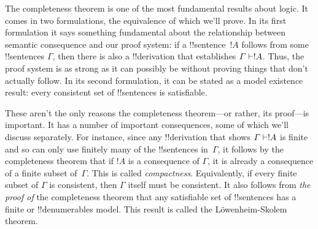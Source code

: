 \documentclass[../../include/open-logic-section]{subfiles}
\begin{document}

The completeness theorem is one of the most fundamental results about
logic.  It comes in two formulations, the equivalence of which we'll
prove.  In its first formulation it says something fundamental about
the relationship between semantic consequence and our proof system: if
a !!{sentence}~$!A$ follows from some !!{sentence}s $\Gamma$, then
there is also a !!{derivation} that establishes $\Gamma \Proves !A$.
Thus, the proof system is as strong as it can possibly be without
proving things that don't actually follow.  In its second formulation,
it can be stated as a model existence result: every consistent set of
!!{sentence}s is satisfiable.

These aren't the only reasons the completeness theorem---or rather,
its proof---is important.  It has a number of important consequences,
some of which we'll discuss separately.  For instance, since any
!!{derivation} that shows $\Gamma \Proves !A$ is finite and so can
only use finitely many of the !!{sentence}s in~$\Gamma$, it follows by
the completeness theorem that if $!A$ is a consequence of $\Gamma$, it
is already a consequence of a finite subset of~$\Gamma$.  This is
called \emph{compactness}.  Equivalently, if every finite subset of
$\Gamma$ is consistent, then $\Gamma$ itself must be consistent.  It
also follows from \emph{the proof of} the completeness theorem that
any satisfiable set of !!{sentence}s has a finite or !!{denumerable}s
model.  This result is called the L\"owenheim-Skolem theorem.
\end{document}
